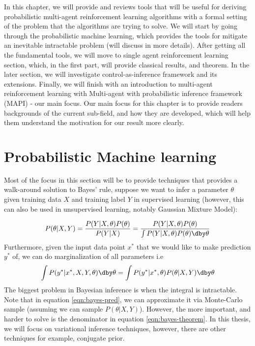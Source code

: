 \label{chapter:chap2}
\begin{adjustwidth}{1cm}{}
    In this chapter, we will provide and reviews tools that will be useful for deriving probabilistic multi-agent reinforcement learning algorithms with a formal setting of the problem that the algorithms are trying to solve. We will start by going through the probabilistic machine learning, which provides the tools for mitigate an inevitable intractable problem (will discuss in more details). After getting all the fundamental tools, we will move to single agent reinforcement learning section, which, in the first part, will provide classical results, and theorem. In the later section, we will investigate control-as-inference framework and its extensions. Finally, we will finish with an introduction to multi-agent reinforcement learning with Multi-agent with probabilistic inference framework (MAPI) - our main focus. Our main focus for this chapter is to provide readers backgrounds of the current sub-field, and how they are developed, which will help them understand the motivation for our result more clearly.
\end{adjustwidth}

\section{Probabilistic Machine learning}
\label{chap2:prob-ml}

Most of the focus in this section will be to provide techniques that provides a walk-around solution to Bayes' rule, suppose we want to infer a parameter $\theta$ given training data $X$ and training label $Y$ in supervised learning (however, this can also be used in unsupervised learning, notably Gaussian Mixture Model): 

\begin{equation}
    \label{eqn:bayes-theorem}
    P(\theta | X, Y) = \frac{P(Y | X, \theta) P(\theta)}{P(Y | X)} = \frac{P(Y | X, \theta) P(\theta)}{\int P(Y | X, \theta) P(\theta ) \dby \theta}
\end{equation}
Furthermore, given the input data point $x^*$ that we would like to make prediction $y^*$ of, we can do marginalization of all parameters i.e
\begin{equation}
    \label{eqn:bayes-pred}
    \int P(y^* | x^*, X, Y, \theta) \dby\theta = \int P(y^* | x^*, \theta) P(\theta | X, Y) \dby\theta
\end{equation}
The biggest problem in Bayesian inference is when the integral is intractable. Note that in equation \ref{eqn:bayes-pred}, we can approximate it via Monte-Carlo sample (assuming we can sample $P(\theta | X, Y)$). However, the more important, and harder to solve is the denominator in equation \ref{eqn:bayes-theorem}. In this thesis, we will focus on variational inference techniques, however, there are other techniques for example, conjugate prior.


